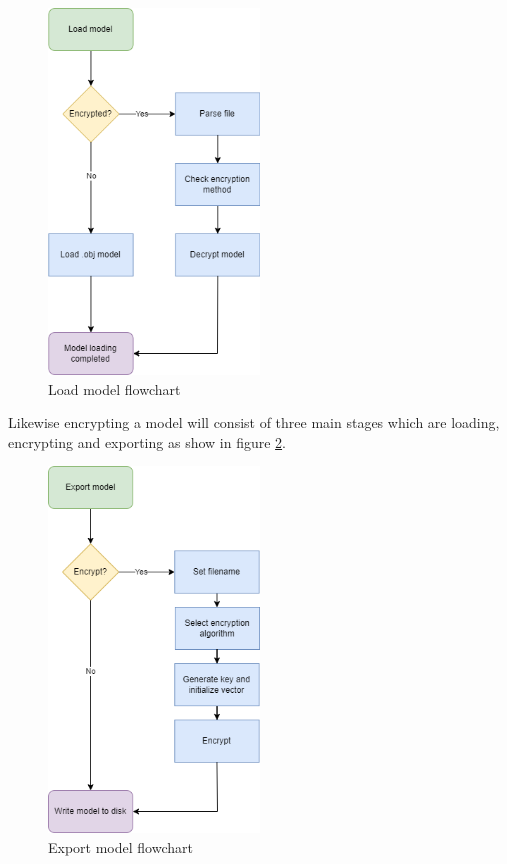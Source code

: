 \documentclass[11pt]{article}
\begin{document}
\begin{figure}[ht]
  \centering
  \includegraphics[width=0.5\textwidth]{images/load_model_flowchart.png}
  \caption{Load model flowchart}
  \label{fig:load_model_flowchart}
\end{figure}

Likewise encrypting a model will consist of three main stages which are loading, encrypting
and exporting as show in figure \ref{fig:export_model_flowchart}.
\begin{figure}[ht]
  \centering
  \includegraphics[width=0.5\textwidth]{images/export_model_flowchart.png}
  \caption{Export model flowchart}
  \label{fig:export_model_flowchart}
\end{figure}
\end{document}
